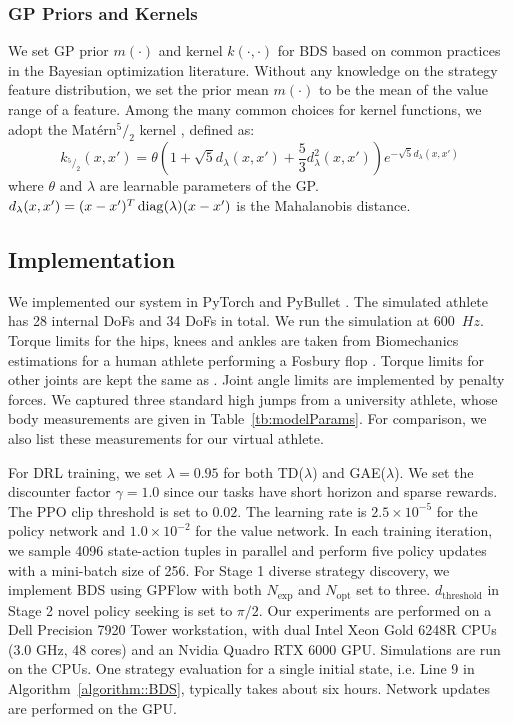 \subsubsection{GP Priors and Kernels}
\label{sec:Experiments-GP-Priors-Kernels}
We set GP prior $m(\cdot)$ and kernel $k(\cdot,\cdot)$ for BDS based on common practices in the Bayesian optimization literature. Without any knowledge on the strategy feature distribution, we set the prior mean $m(\cdot)$ to be the mean of the value range of a feature. Among the many common choices for kernel functions, we adopt the Mat\'ern$^5/_2$ kernel \cite{matern1960spatial,klein2017fast}, defined as:
\begin{equation}
    k_{^5/_2}(x, x') = \theta(1 + \sqrt{5}d_{\lambda}(x,x') + \frac{5}{3}d^{2}_{\lambda}(x, x'))e^{-\sqrt{5}d_{\lambda}(x, x')} 
\end{equation}
where $\theta$ and $\lambda$ are learnable parameters of the GP. 
$d_{\lambda}(x,x') = (x-x')^{T}\mathop{\mathrm{diag}}\nolimits(\lambda)(x-x')$ is the Mahalanobis distance.

\subsection{Implementation}
\label{sec:Experiments-Implementation}

We implemented our system in PyTorch \cite{PyTorch} and PyBullet \cite{coumans2016pybullet}. The simulated athlete has 28 internal DoFs and 34 DoFs in total. We run the simulation at 600~$Hz$. {Torque limits for the hips, knees and ankles are taken from Biomechanics estimations for a human athlete performing a Fosbury flop \cite{Okuyama03}. Torque limits for other joints are kept the same as \cite{Peng:2018:DeepMimic}. Joint angle limits are implemented by penalty forces.} We captured three standard high jumps from a university athlete, whose body measurements are given in Table~\ref{tb:modelParams}. For comparison, we also list these measurements for our virtual athlete. 

For DRL training, we set $\lambda=0.95$ for both TD($\lambda$) and GAE($\lambda$). We set the discounter factor $\gamma=1.0$ since our tasks have short horizon and sparse rewards. The PPO clip threshold is set to $0.02$. The learning rate is $2.5\times 10^{-5}$ for the policy network and $1.0\times 10^{-2}$ for the value network. In each training iteration, we sample 4096 state-action tuples in parallel and perform five policy updates with a mini-batch size of 256. For Stage 1 diverse strategy discovery, we implement BDS using GPFlow \cite{GPflow2020multioutput-gp} with both $N_\text{exp}$ and $N_\text{opt}$ set to three. $d_\text{threshold}$ in Stage 2 novel policy seeking is set to $\pi/2$. Our experiments are performed on a Dell Precision 7920 Tower workstation, with dual Intel Xeon Gold 6248R CPUs (3.0 GHz, 48 cores) and an Nvidia Quadro RTX 6000 GPU. Simulations are run on the CPUs. One strategy evaluation for a single initial state, i.e. Line 9 in Algorithm~\ref{algorithm::BDS}, typically takes about six hours. Network updates are performed on the GPU.
